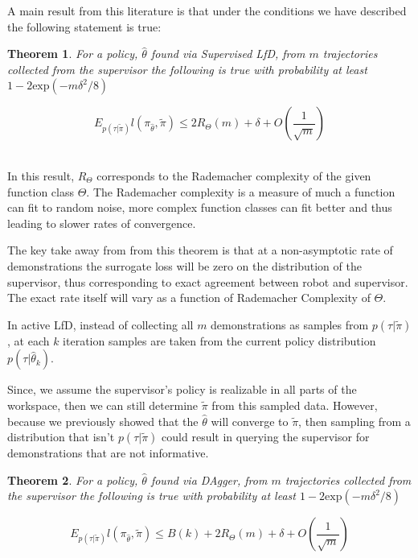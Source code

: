 \documentclass[10pt, conference]{ieeeconf}      %
\newtheorem{theorem}{Theorem}[section]
\begin{document}
A main result from this literature is that under the conditions we have described the following statement is true: \\

\begin{theorem}\label{thm:sup}
For a policy, $\hat{\theta}$ found via Supervised LfD, from $m$ trajectories collected from the supervisor the following is true with probability at least $1- 2\mbox{exp} (-m\delta^2/8)$

$$E_{p(\tau|\tilde{\pi})} l(\pi_{\hat{\theta}}, \tilde{\pi}) \leq 2R_{\Theta}(m) + \delta+ O(\frac{1}{\sqrt{m}})$$\\

\end{theorem}

In this result, $R_{\Theta}$ corresponds to the Rademacher complexity of the given function class $\Theta$. The Rademacher complexity is a measure of much a function can fit to random noise, more complex function classes can fit better and thus leading to slower rates of convergence. 

The key take away from from this theorem  is that at a non-asymptotic rate of demonstrations the surrogate loss will be zero on the distribution of the supervisor, thus corresponding to exact agreement between robot and supervisor. The exact rate itself will vary as a function of Rademacher Complexity of $\Theta$. 

In active LfD, instead of collecting all $m$ demonstrations as samples from $p(\tau |\tilde{\pi})$, at each $k$ iteration  samples are taken from the current policy distribution $p(\tau|\hat{\theta}_k)$.  

Since, we assume the supervisor's policy is realizable in all parts of the workspace, then we can still determine $\tilde{\pi}$ from this sampled data. However, because we previously showed that the $\hat{\theta}$ will converge to $\tilde{\pi}$, then sampling from a distribution that isn't $p(\tau|\tilde{\pi})$ could result in querying the supervisor for demonstrations that are not informative. 

\begin{theorem}\label{thm:sup}
For a policy, $\hat{\theta}$ found via DAgger, from $m$ trajectories collected from the supervisor the following is true with probability at least $1- 2\mbox{exp} (-m\delta^2/8)$

$$E_{p(\tau|\tilde{\pi})} l(\pi_{\hat{\theta}}, \tilde{\pi}) \leq B(k)+ 2R_{\Theta}(m) + \delta+ O(\frac{1}{\sqrt{m}})$$\\

\end{theorem}
\end{document}
